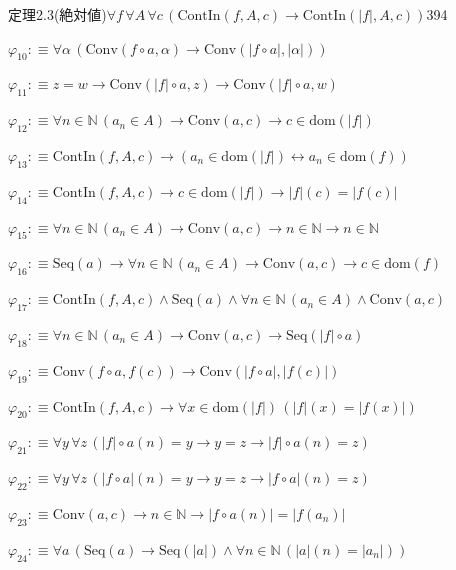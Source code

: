 \begin{fullproof}{定理2.3(絶対値)}{$\forall f\,\forall A\,\forall c\,(\mathrm{ContIn}(f,A,c) \to \mathrm{ContIn}(\lvert f \rvert,A,c))$}{394}
\begin{abbrevlist}
\item $\varphi_{10} :\equiv \forall \alpha\,(\mathrm{Conv}(f \circ a,\alpha) \to \mathrm{Conv}(\lvert f \circ a \rvert,\lvert \alpha \rvert))$
\item $\varphi_{11} :\equiv z = w \to \mathrm{Conv}(\lvert f \rvert \circ a,z) \to \mathrm{Conv}(\lvert f \rvert \circ a,w)$
\item $\varphi_{12} :\equiv \forall n \in \mathbb{N}\,(a_{n} \in A) \to \mathrm{Conv}(a,c) \to c \in \mathrm{dom}(\lvert f \rvert)$
\item $\varphi_{13} :\equiv \mathrm{ContIn}(f,A,c) \to (a_{n} \in \mathrm{dom}(\lvert f \rvert) \leftrightarrow a_{n} \in \mathrm{dom}(f))$
\item $\varphi_{14} :\equiv \mathrm{ContIn}(f,A,c) \to c \in \mathrm{dom}(\lvert f \rvert) \to \lvert f \rvert(c) = \lvert f(c) \rvert$
\item $\varphi_{15} :\equiv \forall n \in \mathbb{N}\,(a_{n} \in A) \to \mathrm{Conv}(a,c) \to n \in \mathbb{N} \to n \in \mathbb{N}$
\item $\varphi_{16} :\equiv \mathrm{Seq}(a) \to \forall n \in \mathbb{N}\,(a_{n} \in A) \to \mathrm{Conv}(a,c) \to c \in \mathrm{dom}(f)$
\item $\varphi_{17} :\equiv \mathrm{ContIn}(f,A,c) \land \mathrm{Seq}(a) \land \forall n \in \mathbb{N}\,(a_{n} \in A) \land \mathrm{Conv}(a,c)$
\item $\varphi_{18} :\equiv \forall n \in \mathbb{N}\,(a_{n} \in A) \to \mathrm{Conv}(a,c) \to \mathrm{Seq}(\lvert f \rvert \circ a)$
\item $\varphi_{19} :\equiv \mathrm{Conv}(f \circ a,f(c)) \to \mathrm{Conv}(\lvert f \circ a \rvert,\lvert f(c) \rvert)$
\item $\varphi_{20} :\equiv \mathrm{ContIn}(f,A,c) \to \forall x \in \mathrm{dom}(\lvert f \rvert)\,(\lvert f \rvert(x) = \lvert f(x) \rvert)$
\item $\varphi_{21} :\equiv \forall y\,\forall z\,(\lvert f \rvert \circ a(n) = y \to y = z \to \lvert f \rvert \circ a(n) = z)$
\item $\varphi_{22} :\equiv \forall y\,\forall z\,(\lvert f \circ a \rvert(n) = y \to y = z \to \lvert f \circ a \rvert(n) = z)$
\item $\varphi_{23} :\equiv \mathrm{Conv}(a,c) \to n \in \mathbb{N} \to \lvert f \circ a(n) \rvert = \lvert f(a_{n}) \rvert$
\item $\varphi_{24} :\equiv \forall a\,(\mathrm{Seq}(a) \to \mathrm{Seq}(\lvert a \rvert) \land \forall n \in \mathbb{N}\,(\lvert a \rvert(n) = \lvert a_{n} \rvert))$

\end{abbrevlist}
\end{fullproof}
